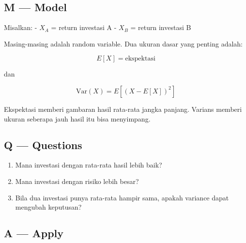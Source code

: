 \documentclass[
  letterpaper,
  DIV=11,
  numbers=noendperiod]{scrreprt}
\providecommand{\tightlist}{%
  \setlength{\itemsep}{0pt}\setlength{\parskip}{0pt}}
\begin{document}
\subsection{M --- Model}\label{m-model-1}

Misalkan: - \(X_A\) = return investasi A - \(X_B\) = return investasi B

Masing-masing adalah random variable. Dua ukuran dasar yang penting
adalah:

\[
E[X] = \text{ekspektasi}
\]

dan

\[
\mathrm{Var}(X) = E[(X - E[X])^2]
\]

Ekspektasi memberi gambaran hasil rata-rata jangka panjang. Varians
memberi ukuran seberapa jauh hasil itu bisa menyimpang.

\subsection{Q --- Questions}\label{q-questions-1}

\begin{enumerate}
\def\labelenumi{\arabic{enumi}.}
\tightlist
\item
  Mana investasi dengan rata-rata hasil lebih baik?
\item
  Mana investasi dengan risiko lebih besar?
\item
  Bila dua investasi punya rata-rata hampir sama, apakah variance dapat
  mengubah keputusan?
\end{enumerate}

\subsection{A --- Apply}\label{a-apply-1}
\end{document}
